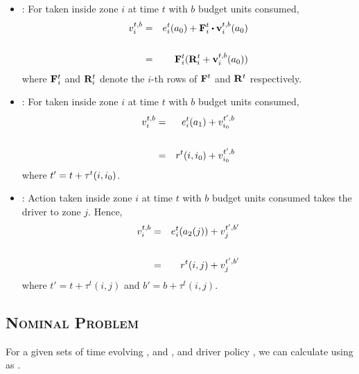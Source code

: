 \begin{itemize}
	\item {\getpassenger} : For {\getpassengeraction} taken inside zone $i$ at time $t$ with $b$ budget units consumed,
	\begin{eqnarray}
	\cumulativeearning{i}{t,b} &=& \actionearning{i}{t}{\getpassengeraction} + \empiricaltransitionmatrix_{i}^{t} \bigcdot \inducedearningvector{i}{t,b}{\getpassengeraction} \\
	\nonumber\\
	&=& \empiricaltransitionmatrix_{i}^{t} (\rewardsmatrix_{i}^{t} + \inducedearningvector{i}{t,b}{\getpassengeraction})
	\end{eqnarray}
	where ${\mathbf{F}}_{i}^{t}$ and ${\mathbf{R}}_{i}^{t}$ denote the $i$-th rows of ${\mathbf{F}}^{t}$ and ${\mathbf{R}}^{t}$ respectively. \\

	\item {\gohome} : For {\gohomeaction} taken inside zone $i$ at time $t$ with $b$ budget units consumed,
	\begin{eqnarray}
	v_{i}^{t,b} &=& e_{i}^{t}({a_1}) + v_{{i_0}}^{t',b} \\
	\nonumber\\
	&=& r^t(i,{i_0}) + v_{{i_0}}^{t',b} 
	\end{eqnarray}
	where $t' = t + \tau^t(i,{i_0})$. \\

	\item {\relocate} : Action {\relocateaction} taken inside zone $i$ at time $t$ with $b$ budget units consumed takes the driver to zone $j$.
	Hence,
	\begin{eqnarray}
	v_{i}^{t,b} &=& e_{i}^{t}({a_2(j)}) + v_{j}^{t',b'} \\
	\nonumber \\
	&=& r^t(i,j) + v_{j}^{t',b'}
	\end{eqnarray}
	where $t' = t + \tau^t(i,j)$ and $b' = b + \tau^t(i,j)$. 
\end{itemize}

\subsection{\textsc{Nominal Problem}}
For a given sets of time evolving {\empiricaltransitionmatrix}, {\traveltimematrix} and {\rewardsmatrix}, and driver policy \policy, we can calculate {\totalexpectedearnings} using as .

